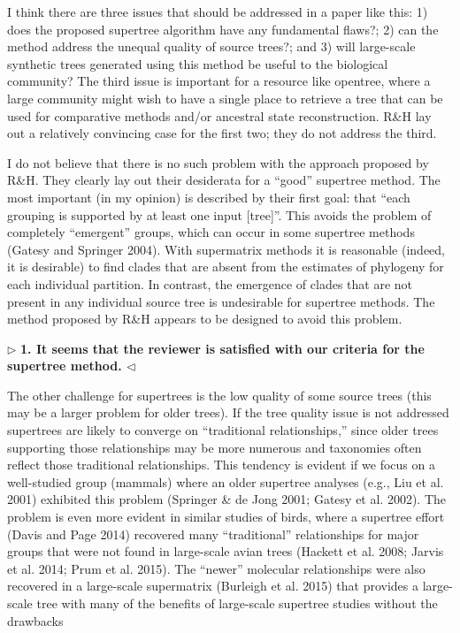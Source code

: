 \documentclass{article}
\newenvironment{reply}{$\triangleright$\bf}{$\triangleleft$}
\begin{document}
I think there are three issues that should be addressed in a paper like this: 1) does the proposed supertree algorithm have any fundamental flaws?; 2) can the method address the unequal quality of source trees?; and 3) will large-scale synthetic trees generated using this method be useful to the biological community? The third issue is important for a resource like opentree, where a large community might wish to have a single place to retrieve a tree that can be used for comparative methods and/or ancestral state reconstruction. R\&H lay out a relatively convincing case for the first two; they do not address the third.

I do not believe that there is no such problem with the approach proposed by R\&H. They clearly lay out their desiderata for a “good” supertree method. The most important (in my opinion) is described by their first goal: that “each grouping is supported by at least one input [tree]”. This avoids the problem of completely “emergent” groups, which can occur in some supertree methods (Gatesy and Springer 2004). With supermatrix methods it is reasonable (indeed, it is desirable) to find clades that are absent from the estimates of phylogeny for each individual partition. In contrast, the emergence of clades that are not present in any individual source tree is undesirable for supertree methods. The method proposed by R\&H appears to be designed to avoid this problem.

\begin{reply}
1. It seems that the reviewer is satisfied with our criteria for the supertree method.
\end{reply}

The other challenge for supertrees is the low quality of some source trees (this may be a larger problem for older trees). If the tree quality issue is not addressed supertrees are likely to converge on “traditional relationships,” since older trees supporting those relationships may be more numerous and taxonomies often reflect those traditional relationships. This tendency is evident if we focus on a well-studied group (mammals) where an older supertree analyses (e.g., Liu et al. 2001) exhibited this problem (Springer \& de Jong 2001; Gatesy et al. 2002). The problem is even more evident in similar studies of birds, where a supertree effort (Davis and Page 2014) recovered many “traditional” relationships for major groups that were not found in large-scale avian trees (Hackett et al. 2008; Jarvis et al. 2014; Prum et al. 2015). The “newer” molecular relationships were also recovered in a large-scale supermatrix (Burleigh et al. 2015) that provides a large-scale tree with many of the benefits of large-scale supertree studies without the drawbacks
\end{document}
